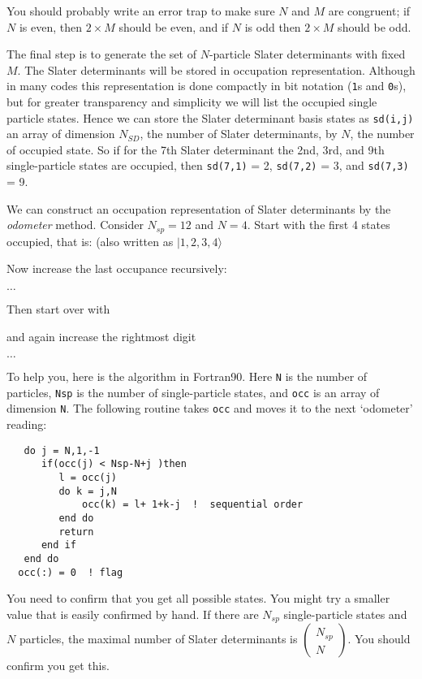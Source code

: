You should probably write an error trap to make sure $N$ and $M$ are congruent; if $N$ is even, then 
$2 \times M$ should be even, and if $N$ is odd then $2\times M$ should be odd. 

The final step is to generate the set of $N$-particle Slater determinants with fixed $M$. 
The Slater determinants will be stored in occupation representation.  Although in many codes
this representation is done compactly in bit notation ({\tt 1}s and {\tt 0}s), but for 
greater transparency and simplicity we will list the occupied single particle states.
 Hence we can 
store the Slater determinant basis states as {\tt sd(i,j)}
an array of dimension $N_{SD}$, the number of Slater determinants, by $N$, the number of occupied 
state. So if for the 7th Slater determinant the 2nd, 3rd, and 9th single-particle states are occupied, 
then {\tt sd(7,1)} = 2, {\tt sd(7,2)} = 3, and {\tt sd(7,3)} = 9.

We can construct an occupation representation of Slater determinants by the \textit{odometer}
method.  Consider $N_{sp} = 12$ and $N=4$. 
Start with the first 4 states occupied, that is:
 (also written as $|1,2,3,4 \rangle$

Now increase the last occupance recursively:




$\ldots$


\smallskip

Then start over with 

\smallskip

and again increase the rightmost digit



$\ldots$


To help you, here is the algorithm in Fortran90.  Here {\tt N} is the number 
of particles, {\tt Nsp} is the number of single-particle states, and 
{\tt occ} is an array of dimension {\tt N}.  The following routine takes {\tt occ} and moves it 
to the next `odometer' reading:

\begin{verbatim}
   do j = N,1,-1
      if(occ(j) < Nsp-N+j )then
         l = occ(j)
         do k = j,N
             occ(k) = l+ 1+k-j  !  sequential order
         end do
         return
      end if
   end do
  occ(:) = 0  ! flag 

\end{verbatim}
 You need to confirm that you get all possible states. You might try a smaller value that is easily 
confirmed by hand. 
If there are $N_{sp}$ single-particle states and $N$ particles, the maximal number of Slater determinants
is $\left( \begin{array}{c} N_{sp} \\ N \end{array} \right )$.  You should confirm you get this.

